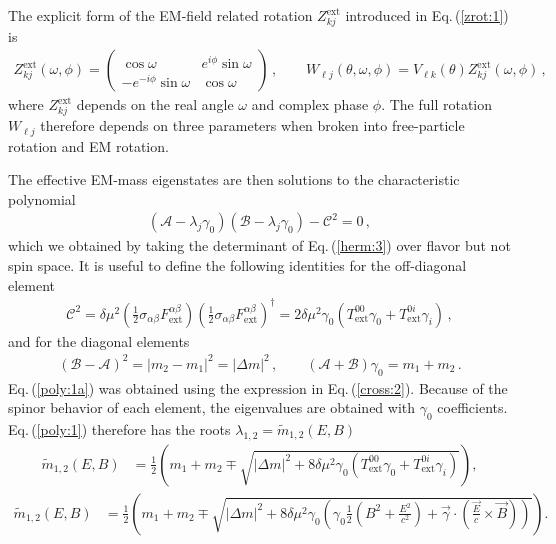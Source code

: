 \documentclass{ws-ijmpa}
\newcommand{\req}[1]{Eq.\,(\ref{#1})}
\begin{document}
The explicit form of the EM-field related rotation $Z_{kj}^\mathrm{ext}$ introduced in \req{zrot:1} is
\begin{align}
\label{zrot:2}
Z_{kj}^\mathrm{ext}(\omega,\phi)=
\begin{pmatrix}
\cos\omega & e^{i\phi}\sin\omega\\
-e^{-i\phi}\sin\omega & \cos\omega
\end{pmatrix}\,,\qquad
W_{\ell j}(\theta,\omega,\phi)=V_{\ell k}(\theta)Z_{kj}^\mathrm{ext}(\omega,\phi)\,,
\end{align}
where $Z_{kj}^\mathrm{ext}$ depends on the real angle $\omega$ and complex phase $\phi$. The full rotation $W_{\ell j}$ therefore depends on three parameters when broken into free-particle rotation and EM rotation.

The effective EM-mass eigenstates are then solutions to the characteristic polynomial
\begin{align}
\label{poly:1}
(\mathcal{A}-\lambda_{j}\gamma_{0})(\mathcal{B}-\lambda_{j}\gamma_{0})-\mathcal{C}^{2}=0\,,
\end{align}
which we obtained by taking the determinant of \req{herm:3} over flavor but not spin space. It is useful to define the following identities for the off-diagonal element
\begin{align}
\label{poly:1a}
\mathcal{C}^{2} = 
\delta\mu^{2}\left(\frac{1}{2}\sigma_{\alpha\beta}F^{\alpha\beta}_\mathrm{ext}\right)\left(\frac{1}{2}\sigma_{\alpha\beta}F^{\alpha\beta}_\mathrm{ext}\right)^{\dag}=
2\delta\mu^{2}\gamma_{0}\left(T_\mathrm{ext}^{00}\gamma_{0}+T_\mathrm{ext}^{0i}\gamma_{i}\right)\,,
\end{align}
and for the diagonal elements
\begin{align}
(\mathcal{B}-\mathcal{A})^{2} = |m_{2}-m_{1}|^{2} = |\Delta m|^{2}\,,\qquad (\mathcal{A}+\mathcal{B})\gamma_{0} = m_{1} + m_{2}\,.
\end{align}
\req{poly:1a} was obtained using the expression in \req{cross:2}. Because of the spinor behavior of each element, the eigenvalues are obtained with $\gamma_{0}$ coefficients. \req{poly:1} therefore has the roots $\lambda_{1,2} = \widetilde m_{1,2}(E,B)$
\begin{align}
\label{poly:2}
\widetilde m_{1,2}(E,B)\! &=\! \frac{1}{2}\left(m_{1}\!+\!m_{2}\!\mp\!\sqrt{|\Delta m|^{2}\!+\!8\delta\mu^{2}\gamma_{0}\left(T_\mathrm{ext}^{00}\gamma_{0}+T_\mathrm{ext}^{0i}\gamma_{i}\right)}\right)\!,
\end{align}
%
\begin{align}
\label{poly:3}
\widetilde m_{1,2}(E,B)\! &=\! \frac{1}{2}\left(m_{1}\!+\!m_{2}\!\mp\!\sqrt{|\Delta m|^{2}\!+\!8\delta\mu^{2}\gamma_{0}\left(\gamma_{0}\frac{1}{2}\left(B^{2}\!+\!\frac{E^{2}}{c^{2}}\right)\!+\!\vec{\gamma}\!\cdot\!(\frac{\vec{E}}{c}\times\vec{B})\right)}\right)\!.
\end{align}
\end{document}
